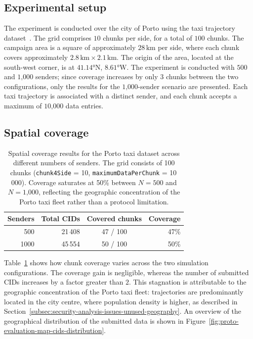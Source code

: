 \subsection{Experimental setup}\label{subsec:spatial-setup}
The experiment is conducted over the city of Porto using the taxi trajectory
dataset~\cite{taxi_trajectory_ecml2015}.
The grid comprises $10$ chunks per side, for a total of $100$ chunks.
The campaign area is a square of approximately $28\,\text{km}$ per side, where
each chunk covers approximately $2{.}8\,\text{km} \times 2{.}1\,\text{km}$.
The origin of the area, located at the south-west corner, is at
$41.14\text{°N}$, $8.61\text{°W}$.
The experiment is conducted with $500$ and $1\text{,}000$ senders; since
coverage increases by only $3$ chunks between the two configurations, only the
results for the $1\text{,}000$-sender scenario are presented.
Each taxi trajectory is associated with a distinct sender, and each chunk
accepts a maximum of $10\text{,}000$ data entries.

\subsection{Spatial coverage}\label{subsec:spatial-coverage}
\begin{table}
    \centering
    \begin{tabular}{|r|r|c|r|}
        \hline
        \textbf{Senders} & \textbf{Total CIDs} & \textbf{Covered chunks} &
        \textbf{Coverage} \\
        \hline
        500  &  21\,408 & 47 / 100 & 47\% \\
        \hline
        1000 &  45\,554 & 50 / 100 & 50\% \\
        \hline
    \end{tabular}
    \caption[Spatial coverage results for the Porto taxi dataset across different numbers of senders.]
    {Spatial coverage results for the Porto taxi dataset across different
    numbers of senders. The grid consists of 100 chunks
        (\lstinline{chunk4Side} = 10, \lstinline{maximumDataPerChunk} = 10\,000).
        Coverage saturates at 50\% between $N = 500$ and $N = 1\text{,}000$,
        reflecting the geographic concentration of the Porto taxi fleet rather than
        a protocol limitation.}
    \label{tab:proto-evaluation-spatial-coverage}
\end{table}

Table~\ref{tab:proto-evaluation-spatial-coverage} shows how chunk coverage
varies across the two simulation configurations.
The coverage gain is negligible, whereas the number of submitted CIDs increases
by a factor greater than $2$.
This stagnation is attributable to the geographic concentration of the Porto
taxi fleet: trajectories are predominantly located in the city centre, where
population density is higher, as described in
Section~\ref{subsec:security-analysis-issues-unused-geography}.
An overview of the geographical distribution of the submitted data is shown in
Figure~\ref{fig:proto-evaluation-map-cids-distribution}.


